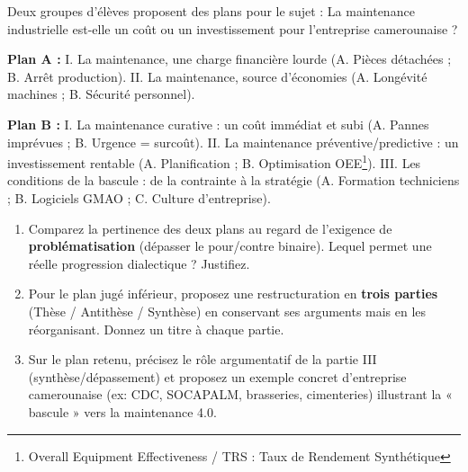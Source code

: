\documentclass[11pt]{article}
\begin{document}
\begin{exercice}
Deux groupes d'élèves proposent des plans pour le sujet : \og La maintenance industrielle est-elle un coût ou un investissement pour l'entreprise camerounaise ? \fg{}

\textbf{Plan A :}
I. La maintenance, une charge financière lourde (A. Pièces détachées ; B. Arrêt production).
II. La maintenance, source d'économies (A. Longévité machines ; B. Sécurité personnel).

\textbf{Plan B :}
I. La maintenance curative : un coût immédiat et subi (A. Pannes imprévues ; B. Urgence = surcoût).
II. La maintenance préventive/predictive : un investissement rentable (A. Planification ; B. Optimisation OEE\footnote{Overall Equipment Effectiveness / TRS : Taux de Rendement Synthétique}).
III. Les conditions de la bascule : de la contrainte à la stratégie (A. Formation techniciens ; B. Logiciels GMAO ; C. Culture d'entreprise).

\begin{enumerate}
    \item Comparez la pertinence des deux plans au regard de l'exigence de \textbf{problématisation} (dépasser le pour/contre binaire). Lequel permet une réelle progression dialectique ? Justifiez.
    \item Pour le plan jugé inférieur, proposez une restructuration en \textbf{trois parties} (Thèse / Antithèse / Synthèse) en conservant ses arguments mais en les réorganisant. Donnez un titre à chaque partie.
    \item Sur le plan retenu, précisez le rôle argumentatif de la partie III (synthèse/dépassement) et proposez un exemple concret d'entreprise camerounaise (ex: CDC, SOCAPALM, brasseries, cimenteries) illustrant la « bascule » vers la maintenance 4.0.
\end{enumerate}
\end{exercice}
\end{document}
